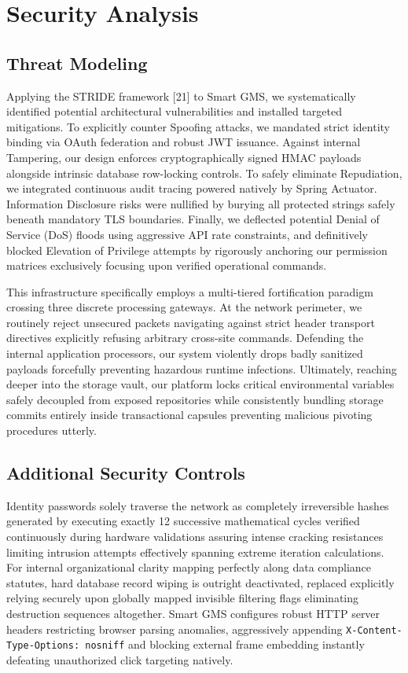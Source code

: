 \section{Security Analysis}\label{security-analysis}

\subsection{Threat Modeling}\label{threat-modeling}

Applying the STRIDE framework {[}21{]} to Smart GMS, we systematically
identified potential architectural vulnerabilities and installed
targeted mitigations. To explicitly counter Spoofing attacks, we
mandated strict identity binding via OAuth federation and robust JWT
issuance. Against internal Tampering, our design enforces
cryptographically signed HMAC payloads alongside intrinsic database
row-locking controls. To safely eliminate Repudiation, we integrated
continuous audit tracing powered natively by Spring Actuator.
Information Disclosure risks were nullified by burying all protected
strings safely beneath mandatory TLS boundaries. Finally, we deflected
potential Denial of Service (DoS) floods using aggressive API rate
constraints, and definitively blocked Elevation of Privilege attempts by
rigorously anchoring our permission matrices exclusively focusing upon
verified operational commands.

This infrastructure specifically employs a multi-tiered fortification
paradigm crossing three discrete processing gateways. At the network
perimeter, we routinely reject unsecured packets navigating against
strict header transport directives explicitly refusing arbitrary
cross-site commands. Defending the internal application processors, our
system violently drops badly sanitized payloads forcefully preventing
hazardous runtime infections. Ultimately, reaching deeper into the
storage vault, our platform locks critical environmental variables
safely decoupled from exposed repositories while consistently bundling
storage commits entirely inside transactional capsules preventing
malicious pivoting procedures utterly.

\subsection{Additional Security
Controls}\label{additional-security-controls}

Identity passwords solely traverse the network as completely
irreversible hashes generated by executing exactly 12 successive
mathematical cycles verified continuously during hardware validations
assuring intense cracking resistances limiting intrusion attempts
effectively spanning extreme iteration calculations. For internal
organizational clarity mapping perfectly along data compliance statutes,
hard database record wiping is outright deactivated, replaced explicitly
relying securely upon globally mapped invisible filtering flags
eliminating destruction sequences altogether. Smart GMS configures
robust HTTP server headers restricting browser parsing anomalies,
aggressively appending \texttt{X-Content-Type-Options: nosniff} and
blocking external frame embedding instantly defeating unauthorized click
targeting natively.

